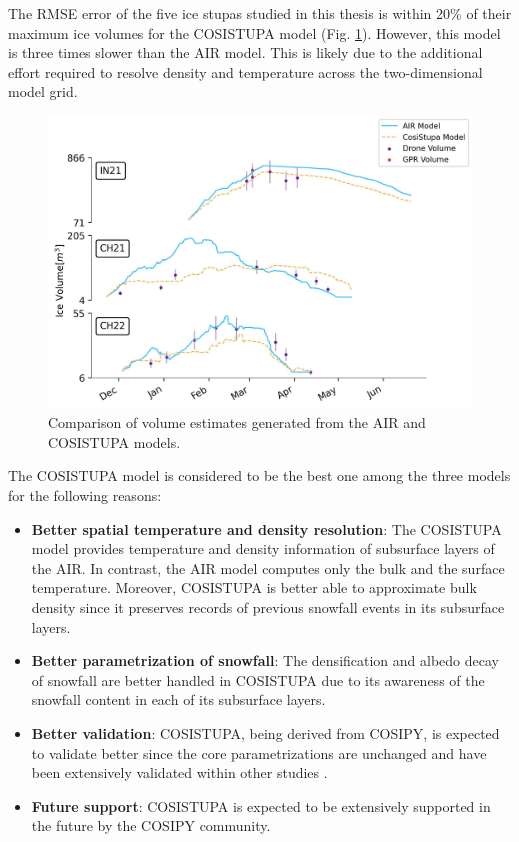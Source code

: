 The \ac{RMSE} error of the five ice stupas studied in this thesis is within 20\% of their maximum ice volumes
for the COSISTUPA model (Fig. \ref{fig:Cosistupa}).  However, this model is three times slower than the \ac{AIR} model.
This is likely due to the additional effort required to resolve density and temperature across the two-dimensional model grid.

\begin{figure}[t]
	\centering
	\includegraphics[width=\textwidth]{figs/model_compare.jpg}

	\caption{Comparison of volume estimates generated from the \ac{AIR} and COSISTUPA models.}

	\label{fig:Cosistupa}
\end{figure}

The COSISTUPA model is considered to be the best one among the three models for the following reasons:

\begin{itemize}

	\item \textbf{Better spatial temperature and density resolution}: The COSISTUPA model provides temperature and density
	      information of subsurface layers of the \ac{AIR}. In contrast, the \ac{AIR} model computes only the bulk and the
	      surface temperature. Moreover, COSISTUPA is better able to approximate bulk density since it preserves records of
	      previous snowfall events in its subsurface layers.

	\item \textbf{Better parametrization of snowfall}: The densification and albedo decay of snowfall are better
	      handled in COSISTUPA due to its awareness of the snowfall content in each of its subsurface layers.

	\item \textbf{Better validation}: COSISTUPA, being derived from COSIPY, is expected to validate better
	      since the core parametrizations are unchanged and have been extensively validated within other studies \citep{arndtAtmosphereDrivenMassBalance2021}.

	\item \textbf{Future support}: COSISTUPA is expected to be extensively supported in the future by the COSIPY
	      community.

\end{itemize}


